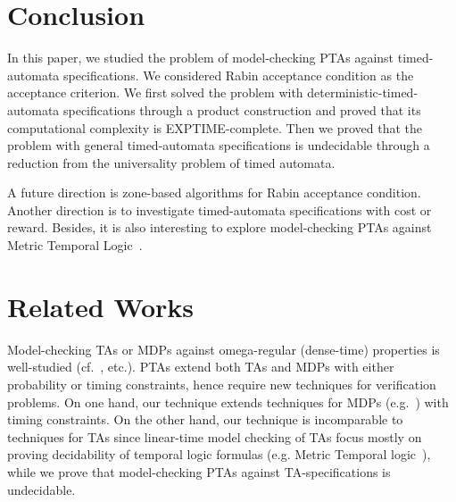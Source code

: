 \section{Conclusion}

In this paper, we studied the problem of model-checking PTAs against timed-automata specifications.
We considered Rabin acceptance condition as the acceptance criterion.
We first solved the problem with deterministic-timed-automata specifications through a product construction and proved that its computational complexity is EXPTIME-complete.
Then we proved that the problem with general timed-automata specifications is undecidable through a reduction from the universality problem of timed automata.

A future direction is zone-based algorithms for Rabin acceptance condition.
Another direction is to investigate timed-automata specifications with cost or reward.
Besides, it is also interesting to explore model-checking PTAs against Metric Temporal Logic~\cite{DBLP:journals/rts/Koymans90}.

\section{Related Works}

Model-checking TAs or MDPs against omega-regular (dense-time) properties is well-studied (cf.~\cite{DBLP:books/daglib/0020348,DBLP:conf/lics/OuaknineW05,DBLP:conf/arts/Vardi99}, etc.).
PTAs extend both TAs and MDPs with either probability or timing constraints,
hence require new techniques for verification problems.
On one hand, our technique extends techniques for MDPs (e.g.~\cite{DBLP:conf/arts/Vardi99}) with timing constraints.
On the other hand, our technique is incomparable to techniques for TAs since linear-time model checking of TAs focus mostly on proving decidability of temporal logic formulas (e.g. Metric Temporal logic~\cite{DBLP:journals/rts/Koymans90,DBLP:journals/jacm/AlurFH96,DBLP:conf/lics/OuaknineW05}),
while we prove that model-checking PTAs against TA-specifications is undecidable.

